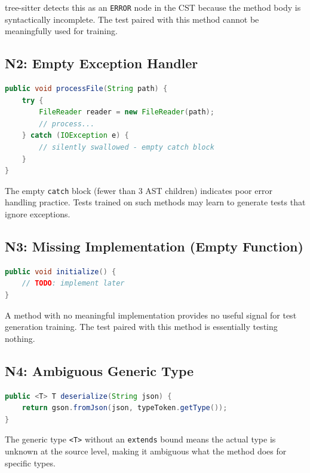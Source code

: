 \documentclass[acmlarge,nonacm,screen]{acmart}
\begin{document}
tree-sitter detects this as an \texttt{ERROR} node in the CST because the method body is syntactically incomplete. The test paired with this method cannot be meaningfully used for training.

\subsection{N2: Empty Exception Handler}

\begin{lstlisting}[language=Java,caption={Focal method with empty catch block}]
public void processFile(String path) {
    try {
        FileReader reader = new FileReader(path);
        // process...
    } catch (IOException e) {
        // silently swallowed - empty catch block
    }
}
\end{lstlisting}

The empty \texttt{catch} block (fewer than 3 AST children) indicates poor error handling practice. Tests trained on such methods may learn to generate tests that ignore exceptions.

\subsection{N3: Missing Implementation (Empty Function)}

\begin{lstlisting}[language=Java,caption={Focal method with empty body}]
public void initialize() {
    // TODO: implement later
}
\end{lstlisting}

A method with no meaningful implementation provides no useful signal for test generation training. The test paired with this method is essentially testing nothing.

\subsection{N4: Ambiguous Generic Type}

\begin{lstlisting}[language=Java,caption={Focal method with unbounded generic}]
public <T> T deserialize(String json) {
    return gson.fromJson(json, typeToken.getType());
}
\end{lstlisting}

The generic type \texttt{<T>} without an \texttt{extends} bound means the actual type is unknown at the source level, making it ambiguous what the method does for specific types.
\end{document}
